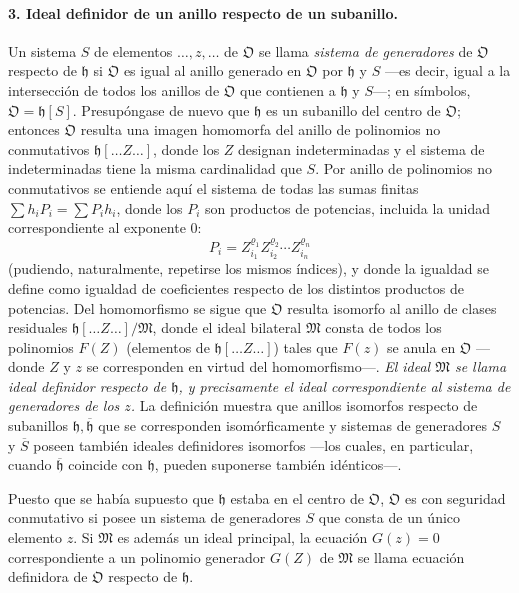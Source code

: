 \paragraph{3. Ideal definidor de un anillo respecto de un subanillo.}
Un sistema $S$ de elementos $\ldots,z,\ldots$ de $\mathfrak O$ se llama \emph{sistema de generadores} de $\mathfrak O$ respecto de $\mathfrak h$ si $\mathfrak O$ es igual al anillo generado en $\mathfrak O$ por $\mathfrak h$ y $S$ ---es decir, igual a la intersección de todos los anillos de $\mathfrak O$ que contienen a $\mathfrak h$ y $S$---; en símbolos, $\mathfrak O=\mathfrak h[S]$. Presupóngase de nuevo que $\mathfrak h$ es un subanillo del centro de $\mathfrak O$; entonces $\mathfrak O$ resulta una imagen homomorfa del anillo de polinomios no conmutativos $\mathfrak h[\ldots Z\ldots]$, donde los $Z$ designan indeterminadas y el sistema de indeterminadas tiene la misma cardinalidad que $S$. Por anillo de polinomios no conmutativos se entiende aquí el sistema de todas las sumas finitas $\sum h_iP_i=\sum P_i h_i$, donde los $P_i$ son productos de potencias, incluida la unidad correspondiente al exponente $0$:
\[
P_i=Z_{i_1}^{\varrho_1}Z_{i_2}^{\varrho_2}\cdots Z_{i_n}^{\varrho_n}
\]
(pudiendo, naturalmente, repetirse los mismos índices), y donde la igualdad se define como igualdad de coeficientes respecto de los distintos productos de potencias. Del homomorfismo se sigue que $\mathfrak O$ resulta isomorfo al anillo de clases residuales $\mathfrak h[\ldots Z\ldots]/\mathfrak M$, donde el ideal bilateral $\mathfrak M$ consta de todos los polinomios $F(Z)$ (elementos de $\mathfrak h[\ldots Z\ldots]$) tales que $F(z)$ se anula en $\mathfrak O$ ---donde $Z$ y $z$ se corresponden en virtud del homomorfismo---. \emph{El ideal $\mathfrak M$ se llama ideal definidor respecto de $\mathfrak h$, y precisamente el ideal correspondiente al sistema de generadores de los $z$.} La definición muestra que anillos isomorfos respecto de subanillos $\mathfrak h,\overline{\mathfrak h}$ que se corresponden isomórficamente y sistemas de generadores $S$ y $\overline S$ poseen también ideales definidores isomorfos ---los cuales, en particular, cuando $\overline{\mathfrak h}$ coincide con $\mathfrak h$, pueden suponerse también idénticos---.

Puesto que se había supuesto que $\mathfrak h$ estaba en el centro de $\mathfrak O$, $\mathfrak O$ es con seguridad conmutativo si posee un sistema de generadores $S$ que consta de un único elemento $z$. Si $\mathfrak M$ es además un ideal principal, la ecuación $G(z)=0$ correspondiente a un polinomio generador $G(Z)$ de $\mathfrak M$ se llama ecuación definidora de $\mathfrak O$ respecto de $\mathfrak h$.

